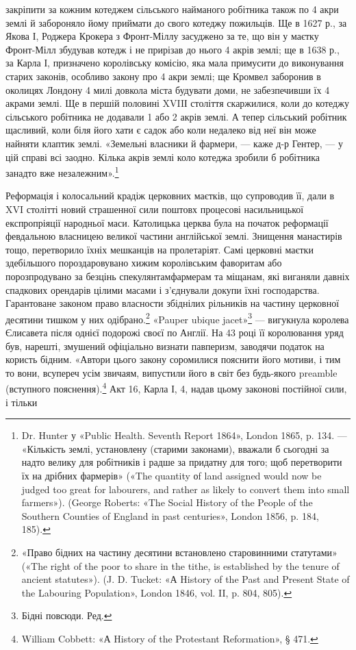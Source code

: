 \parcont{}  %
закріпити за кожним котеджем сільського найманого робітника
також по 4 акри землі й забороняло йому приймати до свого
котеджу пожильців. Ще в 1627 р., за Якова І, Роджера Крокера
з Фронт-Міллу засуджено за те, що він у маєтку Фронт-Мілл
збудував котедж і не прирізав до нього 4 акрів землі; ще в 1638 р.,
за Карла І, призначено королівську комісію, яка мала примусити
до виконування старих законів, особливо закону про 4 акри
землі; ще Кромвел заборонив в околицях Лондону 4 милі довкола
міста будувати доми, не забезпечивши їх 4 акрами землі. Ще в
першій половині XVIIІ століття скаржилися, коли до котеджу
сільського робітника не додавали 1 або 2 акрів землі. А тепер
сільський робітник щасливий, коли біля його хати є садок або
коли недалеко від неї він може найняти клаптик землі. «Земельні
власники й фармери, — каже д-р Гентер, — у цій справі всі заодно.
Кілька акрів землі коло котеджа зробили б робітника
занадто вже незалежним».\footnote{
Dr. Hunter у «Public Health. Seventh Report 1864», London 1865,
p. 134. — «Кількість землі, установлену (старими законами), вважали б
сьогодні за надто велику для робітників і радше за придатну для того;
щоб перетворити їх на дрібних фармерів» («The quantity оf land assigned
would now be judged too great for labourers, and rather as likely to
convert them into small farmers»). (George Roberts: «The Social History
of the People of the Southern Counties of England in past centuries», London
1856, p. 184, 185).
}

Реформація і колосальний крадіж церковних маєтків, що
супроводив її, дали в XVI столітті новий страшенної сили поштовх
процесові насильницької експропріяції народньої маси.
Католицька церква була на початок реформації февдальною
власницею великої частини англійської землі. Знищення манастирів
тощо, перетворило їхніх мешканців на пролетаріят.
Самі церковні маєтки здебільшого пороздаровувано хижим королівським
фаворитам або порозпродувано за безцінь спекулянтамфармерам
та міщанам, які виганяли давніх спадкових орендарів
цілими масами і з’єднували докупи їхні господарства. Гарантоване
законом право власности збіднілих рільників на частину
церковної десятини тишком у них одібрано.\footnote{
«Право бідних на частину десятини встановлено старовинними
статутами» («The right of the poor to share in the tithe, is established by
the tenure of ancient statutes»). (J. D. Tucket: «А History of the Past
and Present State of the Labouring Population», London 1846, vol. II,
p. 804, 805).
} «Pauper ubique
jacet»\footnote*{
Бідні повсюди. Ред.
} — вигукнула королева Єлисавета після однієї подорожі
своєї по Англії. На 43 році її королювання уряд був, нарешті,
змушений офіціально визнати павперизм, заводячи податок на
користь бідним. «Автори цього закону соромилися пояснити
його мотиви, і тим то вони, всупереч усім звичаям, випустили
його в світ без будь-якого preamble (вступного пояснення).\footnote{
William Cobbett: «А History of the Protestant Reformation», § 471.
}
Акт 16, Карла І, 4, надав цьому законові постійної сили, і тільки
\parbreak{}  %
